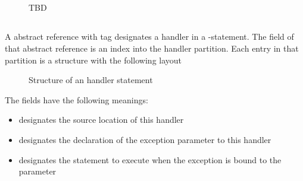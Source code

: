 
\subsection{}
\label{sec:ifc:StmtSort:SyntaxTree}

\begin{figure}[H]
	\centering
	TBD
\end{figure}


\subsection{}
\label{sec:ifc:StmtSort:Handler}

A  abstract reference with tag  designates a handler in a -statement.
The  field of that abstract reference is an index into the handler partition.
Each entry in that partition is a structure with the following layout
%
\begin{figure}[H]
	\centering
	\caption{Structure of an handler statement}
	\label{fig:ifc-handler-stmt-structure}
\end{figure}
%
The fields have the following meanings:
\begin{itemize}
	\item {} designates the source location of this handler
	\item {} designates the declaration of the exception parameter to this handler
	\item {} designates the statement to execute when the exception is bound to the parameter
\end{itemize}


\subsection{}
\label{sec:ifc:StmtSort:Tuple}

